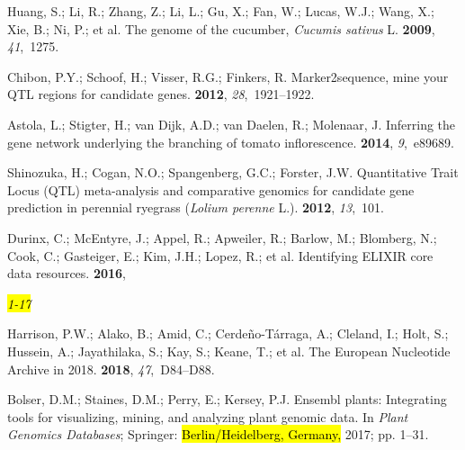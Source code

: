 \documentclass[applsci,article,accept,moreauthors,pdftex]{Definitions/mdpi}
\begin{document}
{\begin{thebibliography}{999}
Huang, S.; Li, R.; Zhang, Z.; Li, L.; Gu, X.; Fan, W.; Lucas, W.J.; Wang, X.;
  Xie, B.; Ni, P.; et al.
\newblock The genome of the cucumber, \emph{Cucumis sativus} L.
 {\bf 2009}, {\em 41},~1275.

Chibon, P.Y.; Schoof, H.; Visser, R.G.; Finkers, R.
\newblock Marker2sequence, mine your QTL regions for candidate genes.
 {\bf 2012}, {\em 28},~1921--1922.

Astola, L.; Stigter, H.; van Dijk, A.D.; van Daelen, R.; Molenaar, J.
\newblock Inferring the gene network underlying the branching of tomato
  inflorescence.
 {\bf 2014}, {\em 9},~e89689.

Shinozuka, H.; Cogan, N.O.; Spangenberg, G.C.; Forster, J.W.
\newblock Quantitative Trait Locus (QTL) meta-analysis and comparative genomics
  for candidate gene prediction in perennial ryegrass (\emph{Lolium perenne} L.).
 {\bf 2012}, {\em 13},~101.

Durinx, C.; McEntyre, J.; Appel, R.; Apweiler, R.; Barlow, M.; Blomberg, N.;
  Cook, C.; Gasteiger, E.; Kim, J.H.; Lopez, R.; et al.
\newblock Identifying ELIXIR core data resources.
 {\bf 2016}, {\em \hl{1-17} %

Harrison, P.W.; Alako, B.; Amid, C.; Cerde{\~n}o-T{\'a}rraga, A.; Cleland, I.;
  Holt, S.; Hussein, A.; Jayathilaka, S.; Kay, S.; Keane, T.; et al.
\newblock The European Nucleotide Archive in 2018.
 {\bf 2018}, {\em 47},~D84--D88.

Bolser, D.M.; Staines, D.M.; Perry, E.; Kersey, P.J.
\newblock Ensembl plants: Integrating tools for visualizing, mining, and
  analyzing plant genomic data. In {\em Plant Genomics Databases}; Springer:  \hl{Berlin/Heidelberg, Germany,} %
  2017; pp. 1--31.

}
\end{thebibliography}}
\end{document}
